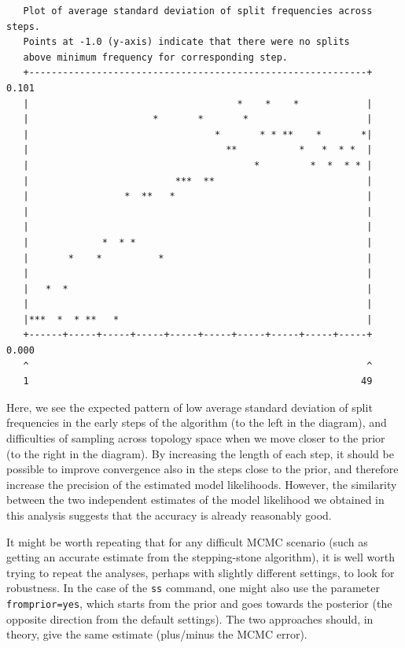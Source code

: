 \documentclass[12pt]{book}
\newcommand{\ttt}[1]{\texttt{#1}}
\begin{document}
\footnotesize
\begin{singlespacing}
\begin{verbatim}
   Plot of average standard deviation of split frequencies across steps.
   Points at -1.0 (y-axis) indicate that there were no splits
   above minimum frequency for corresponding step.
   +------------------------------------------------------------+ 0.101
   |                                     *    *    *            |
   |                      *       *       *                     |
   |                                 *       * * **    *       *|
   |                                   **           *   *  * *  |
   |                                        *         *  *  * * |
   |                          ***  **                           |
   |                 *  **   *                                  |
   |                                                            |
   |                                                            |
   |             *  * *                                         |
   |       *    *          *                                    |
   |                                                            |
   |   *  *                                                     |
   |                                                            |
   |***  *  * **   *                                            |
   +------+-----+-----+-----+-----+-----+-----+-----+-----+-----+ 0.000
   ^                                                            ^
   1                                                           49
\end{verbatim}
\end{singlespacing}
\normalsize

Here, we see the expected pattern of low average standard deviation of split frequencies in the
early steps of the algorithm (to the left in the diagram), and difficulties of sampling across
topology space when we move closer to the prior (to the right in the diagram). By increasing the
length of each step, it should be possible to improve convergence also in the steps close to the
prior, and therefore increase the precision of the estimated model likelihoods. However, the
similarity between the two independent estimates of the model likelihood we obtained in this
analysis suggests that the accuracy is already reasonably good.

It might be worth repeating that for any difficult MCMC scenario (such as getting an accurate
estimate from the stepping-stone algorithm), it is well worth trying to repeat the analyses,
perhaps with slightly different settings, to look for robustness. In the case of the \ttt{ss}
command, one might also use the parameter \ttt{fromprior=yes}, which starts from the prior and goes
towards the posterior (the opposite direction from the default settings). The two approaches
should, in theory, give the same estimate (plus/minus the MCMC error).
\end{document}
